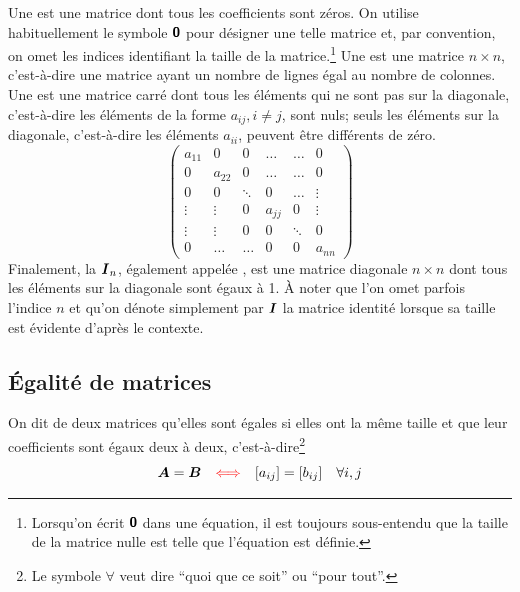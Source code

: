 Une  est une matrice dont tous les coefficients sont zéros. On utilise
habituellement le symbole $\mbox{\textsf{\textbf{{0}}}}$ pour désigner une telle matrice et, par convention, on omet
les indices identifiant la taille de la matrice.\footnote{Lorsqu'on écrit $\mbox{\textsf{\textbf{{0}}}}$ dans une équation, il
est toujours sous-entendu que la taille de la matrice nulle est telle que l'équation est définie.}
Une  est une matrice $n\times n$, c'est-à-dire une matrice ayant un nombre de
lignes égal au nombre de colonnes.
Une  est une matrice carré dont tous les éléments qui ne sont pas sur la diagonale,
c'est-à-dire les éléments de la forme $a_{ij}, i\ne j$, sont nuls; seuls les éléments sur la diagonale,
c'est-à-dire les éléments $a_{ii}$, peuvent être différents de zéro.
\[
\begin{pmatrix}
a_{11} & 0 & 0 & \ldots & \ldots & 0 \\
0 & a_{22} & 0 & \ldots & \ldots & 0\\
0 & 0 & \ddots & 0 & \dots & \vdots\\
\vdots & \vdots& 0& a_{jj} & 0& \vdots \\
\vdots & \vdots & 0 & 0 & \ddots& 0 \\
 0 & \ldots &\ldots & 0 & 0 & a_{nn}
\end{pmatrix}
\]
Finalement, la  $\boldsymbol{I}_n$, également appelée , est une matrice diagonale $n\times n$ dont tous les
éléments sur la diagonale sont égaux à 1. 
À noter que l'on omet parfois l'indice $n$ et qu'on dénote simplement par $\boldsymbol{I}$ la matrice
identité lorsque sa taille est évidente d'après le contexte.

\subsection{Égalité de matrices}
\begin{defini}
On dit de deux matrices qu'elles sont égales si elles ont la même taille
et que leur coefficients sont égaux deux à deux, c'est-à-dire\footnote{Le symbole $\forall$ veut dire 
``quoi que ce soit'' ou ``pour tout''.}
\[
\boldsymbol{A} = \boldsymbol{B} \quad {\color{red}\Longleftrightarrow} \quad [a_{ij}] = [b_{ij}]  \quad \forall i, j
\]
\end{defini}

